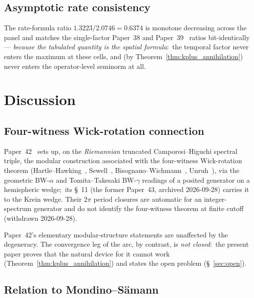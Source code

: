 \documentclass[11pt,a4paper]{article}
\theoremstyle{plain}
\theoremstyle{definition}
\begin{document}
\subsection{Asymptotic rate consistency}\label{sec:asymp_consistency}

The rate-formula ratio $1.3223 / 2.0746 = 0.6374$ is monotone
decreasing across the panel and matches the single-factor Paper~38
and Paper~39~\cite{paper39} ratios bit-identically — \emph{because
the tabulated quantity is the spatial formula}:\ the temporal factor
never enters the maximum at these cells, and (by
Theorem~\ref{thm:kplus_annihilation}) never enters the operator-level
seminorm at all.

\section{Discussion}\label{sec:discussion}

\subsection{Four-witness Wick-rotation connection}\label{sec:four_witness}

Paper~42~\cite{paper42} sets up, on the \emph{Riemannian} truncated
Camporesi--Higuchi spectral triple, the modular construction associated
with the four-witness Wick-rotation theorem
(Hartle--Hawking~\cite{hartle_hawking1976},
Sewell~\cite{sewell1982},
Bisognano--Wichmann~\cite{bisognano_wichmann1976},
Unruh~\cite{unruh1976}), via the geometric BW-$\alpha$ and
Tomita--Takesaki BW-$\gamma$ readings of a posited generator on a
hemispheric wedge;\ its \S~11 (the former Paper~43, archived 2026-09-28)
carries it to the Krein wedge.  Their $2\pi$ period closures are automatic for an
integer-spectrum generator and do not identify the four-witness theorem
at finite cutoff (withdrawn 2026-09-28).

Paper~42's elementary modular-structure statements are unaffected
by the degeneracy. The convergence leg
of the arc, by contrast, is \emph{not closed}:\ the present paper
proves that the natural device for it cannot work
(Theorem~\ref{thm:kplus_annihilation}) and states the open problem
(\S~\ref{sec:open}).

\subsection{Relation to Mondino--S\"amann}\label{sec:mondino_samann}
\end{document}
